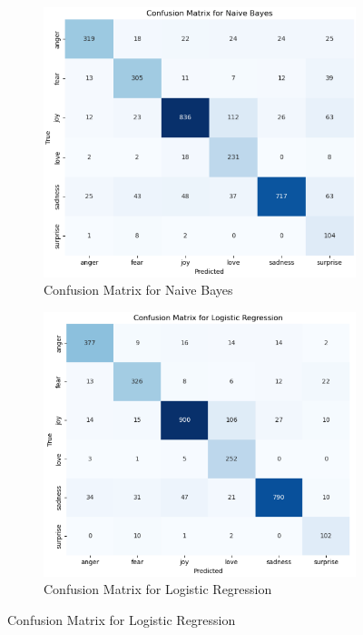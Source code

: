 \begin{figure}[h!]
	\centering
	\begin{subfigure}[b]{0.45\textwidth}
		\centering
		\includegraphics[width=\textwidth]{confusion_matrix_01.png}
		\caption{Confusion Matrix for Naive Bayes}
		\label{fig:final_confusion_matrix_naive_bayes}
	\end{subfigure}
	\hfill
	\begin{subfigure}[b]{0.45\textwidth}
		\centering
		\includegraphics[width=\textwidth]{confusion_matrix_01.1.png}
		\caption{Confusion Matrix for Logistic Regression}
		\label{fig:final_confusion_matrix_logistic_regression}
	\end{subfigure}
	

\end{figure}
